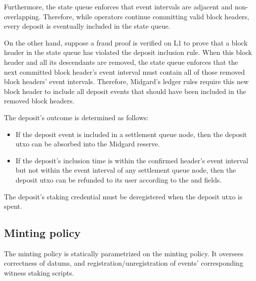 \documentclass[../midgard.tex]{subfiles}
\begin{document}
Furthermore, the state queue enforces that event intervals are adjacent and non-overlapping.
Therefore, while operators continue committing valid block headers, every deposit is eventually included in the state queue.

On the other hand, suppose a fraud proof is verified on L1 to prove that a block header in the state queue has violated the deposit inclusion rule.
When this block header and all its descendants are removed, the state queue enforces that the next committed block header's event interval must contain all of those removed block headers' event intervals.
Therefore, Midgard's ledger rules require this new block header to include all deposit events that should have been included in the removed block headers.

The deposit's outcome is determined as follows:
\begin{itemize}
    \item If the deposit event is included in a settlement queue node, then the deposit utxo can be absorbed into the Midgard reserve.
    \item If the deposit's inclusion time is within the confirmed header's event interval but not within the event interval of any settlement queue node, then the deposit utxo can be refunded to its user according to the  and  fields.
\end{itemize}

The deposit's  staking credential must be deregistered when the deposit utxo is spent.

\subsection{Minting policy}
\label{h:deposit-minting-policy}

The  minting policy is statically parametrized on the  minting policy.
It oversees correctness of datums, and registration/unregistration of events' corresponding witness staking scripts.
\end{document}
